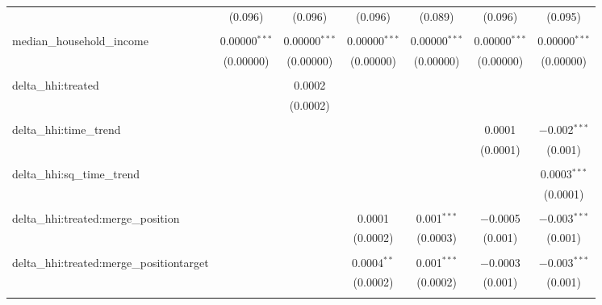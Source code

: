 \begin{table}[H]
{\begin{tabular}{@{\extracolsep{5pt}}lcccccc}
   & (0.096) & (0.096) & (0.096) & (0.089) & (0.096) & (0.095) \\  

   & & & & & & \\  

  median\_household\_income & 0.00000$^{***}$ & 0.00000$^{***}$ & 0.00000$^{***}$ & 0.00000$^{***}$ & 0.00000$^{***}$ & 0.00000$^{***}$ \\  

   & (0.00000) & (0.00000) & (0.00000) & (0.00000) & (0.00000) & (0.00000) \\  

   & & & & & & \\  

  delta\_hhi:treated &  & 0.0002 &  &  &  &  \\  

   &  & (0.0002) &  &  &  &  \\  

   & & & & & & \\  

  delta\_hhi:time\_trend &  &  &  &  & 0.0001 & $-$0.002$^{***}$ \\  

   &  &  &  &  & (0.0001) & (0.001) \\  

   & & & & & & \\  

  delta\_hhi:sq\_time\_trend &  &  &  &  &  & 0.0003$^{***}$ \\  

   &  &  &  &  &  & (0.0001) \\  

   & & & & & & \\  

  delta\_hhi:treated:merge\_position &  &  & 0.0001 & 0.001$^{***}$ & $-$0.0005 & $-$0.003$^{***}$ \\  

   &  &  & (0.0002) & (0.0003) & (0.001) & (0.001) \\  

   & & & & & & \\  

  delta\_hhi:treated:merge\_positiontarget &  &  & 0.0004$^{**}$ & 0.001$^{***}$ & $-$0.0003 & $-$0.003$^{***}$ \\  

   &  &  & (0.0002) & (0.0002) & (0.001) & (0.001) \\  

   & & & & & & \\  


\end{tabular}}
\end{table}
